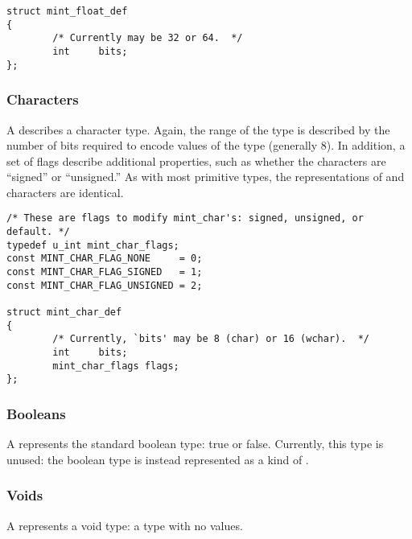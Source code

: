 \begin{verbatim}
struct mint_float_def
{
        /* Currently may be 32 or 64.  */
        int     bits;
};
\end{verbatim}


\subsubsection{Characters}

A  describes a character type.  Again, the range of the type is
described by the number of bits required to encode values of the type
(generally 8).  In addition, a set of flags describe additional properties,
such as whether the characters are ``signed'' or ``unsigned.''  As with most
primitive types, the representations of \MINT{} and \AOI{} characters are
identical.

\begin{verbatim}
/* These are flags to modify mint_char's: signed, unsigned, or default. */
typedef u_int mint_char_flags;
const MINT_CHAR_FLAG_NONE     = 0;
const MINT_CHAR_FLAG_SIGNED   = 1;
const MINT_CHAR_FLAG_UNSIGNED = 2;

struct mint_char_def
{
        /* Currently, `bits' may be 8 (char) or 16 (wchar).  */
        int     bits;
        mint_char_flags flags;
};
\end{verbatim}


\subsubsection{Booleans}

A  represents the standard boolean type: true or false.
Currently, this type is unused: the boolean type is instead represented as a
kind of .


\subsubsection{Voids}

A  represents a void type: a type with no values.



